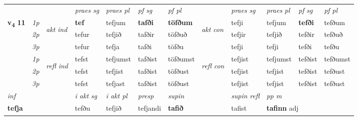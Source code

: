 \begin{longtable}[l]{X>{\footnotesize\itshape}llXXXXlXXXX}
 & &   & \textit{praes sg}  & \textit{praes pl}    & \textit{ pf sg} & \textit{pf pl} & & \textit{praes sg}  & \textit{praes pl}    & \textit{pf sg} & \textit{pf pl }  \\ \cmidrule{4-7} \cmidrule{9-12}
 \multirow{2}{*}{{{\textbf{v{\textsubscript{4}}} \Large{\textbf{11}}}}}  & 1p & \multirow{3}{*}{\begin{turn}{90}\textit{akt ind}\end{turn}} & \textbf{tef} & tefjum & \textbf{tafði} & \textbf{töfðum} & \multirow{3}{*}{\begin{turn}{90}\textit{akt con}\end{turn}} &tefji & tefjum & \textbf{tefði} & tefðum\\*
 & 2p &  &  tefur  & tefjið & tafðir & töfðuð & & tefjir & tefjið & tefðir & tefðuð \\*
 & 3p &  & tefur & tefja & tafði & töfðu & & tefji & tefji& tefði & tefðu \\*
\cmidrule{4-7} \cmidrule{9-12}
 & 1p & \multirow{3}{*}{\begin{turn}{90}\textit{refl ind}\end{turn}}  & tefst & tefjumst & tafðist & töfðumst & \multirow{3}{*}{\begin{turn}{90}\textit{refl con}\end{turn}}  &tefjist & tefjumst & tefðist & tefðumst \\*
 & 2p &  & tefst & tefjist & tafðist & töfðust & &tefjist & tefjist & tefðist & tefðust \\*
 & 3p  & & tefst & tefjast & tafðist & töfðust & & tefjist & tefjist& tefðist & tefðust \\*
\cmidrule{4-7} \cmidrule{9-12}

   {\textit{inf}} & &  & \textit{i akt sg} & \textit{i akt pl}   & \textit{presp} & \textit{supin} && \textit{supin refl} & \textit{pp m} \\*
  {\textbf{tefja}} & && tefðu  & tefjið   & tefjandi &  \textbf{tafið} && tafist & \multicolumn{2}{l}{\textbf{tafinn} adj\textbf{\textsubscript{}}} \\*


\end{longtable}
